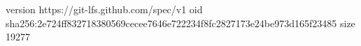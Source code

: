 version https://git-lfs.github.com/spec/v1
oid sha256:2e724ff832718380569cecee7646e722234f8fc2827173e24be973d165f23485
size 19277
